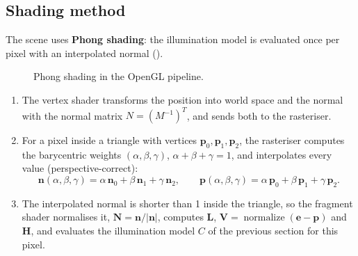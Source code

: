 \subsection{Shading method}\label{sec:shading}
The scene uses \textbf{Phong shading}: the illumination model is evaluated once per pixel with an interpolated
normal ().
\begin{figure}[H]
\centering
{}
\caption{Phong shading in the OpenGL pipeline.}\label{fig:shadingpipe}
\end{figure}
\begin{enumerate}
  \item The vertex shader transforms the position into world space and the normal with the normal matrix
        $N=(M^{-1})^T$, and sends both to the rasteriser.
  \item For a pixel inside a triangle with vertices $\mathbf{p}_0,\mathbf{p}_1,\mathbf{p}_2$, the rasteriser computes the
        barycentric weights $(\alpha,\beta,\gamma)$, $\alpha+\beta+\gamma=1$, and interpolates every value
        (perspective-correct):
        \[
        \mathbf{n}(\alpha,\beta,\gamma) = \alpha\,\mathbf{n}_0 + \beta\,\mathbf{n}_1 + \gamma\,\mathbf{n}_2,\qquad
        \mathbf{p}(\alpha,\beta,\gamma) = \alpha\,\mathbf{p}_0 + \beta\,\mathbf{p}_1 + \gamma\,\mathbf{p}_2 .
        \]
  \item The interpolated normal is shorter than 1 inside the triangle, so the fragment shader normalises it,
        $\mathbf{N}=\mathbf{n}/|\mathbf{n}|$, computes $\mathbf{L}$, $\mathbf{V}=\operatorname{normalize}(\mathbf{e}-\mathbf{p})$ and
        $\mathbf{H}$, and evaluates the illumination model $C$ of the previous section for this pixel.
\end{enumerate}
